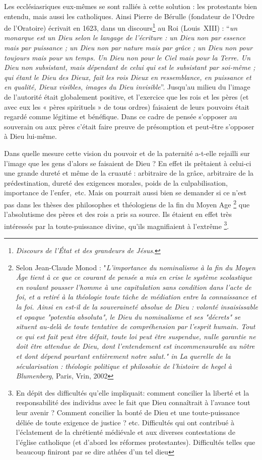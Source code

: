 Les ecclésiasriques eux-mêmes se sont ralliés à cette solution : les protestants bien entendu, mais aussi les catholiques. Ainsi Pierre de Bérulle (fondateur de l'Ordre de l'Oratoire) écrivait en 1623, dans un discours\footnote{\emph{Discours de l'État et des grandeurs de Jésus}.} au Roi (Louis~XIII)  :
    \enquote{\emph{un monarque est un Dieu selon le langage de l'écriture : un Dieu non par essence mais par puissance ; un Dieu non par nature mais par grâce ; un Dieu non pour toujours mais pour un temps. Un Dieu non pour le Ciel mais pour la Terre. Un Dieu non subsistant, mais dépendant de celui qui est le subsistant par soi-même ; qui étant le Dieu des Dieux, fait les rois Dieux en ressemblance, en puissance et en qualité, Dieux visibles, images du Dieu invisible}}. Jusqu'au milieu du  l'image de l'autorité était globalement positive, et l'exercice que les rois et les pères (et avec eux les « pères spirituels » de tous ordres) faisaient de leurs pouvoirs était regardé comme légitime et bénéfique. Dans ce cadre de pensée s'opposer au souverain ou aux pères c'était faire preuve de présomption et peut-être s'opposer à Dieu lui-même. 
    
    Dans quelle mesure cette vision du pouvoir et de la paternité a-t-elle rejailli sur l'image que les gens d'alors se faisaient de Dieu ? En effet ils prêtaient à celui-ci une grande dureté et même de la cruauté : arbitraire de la grâce, arbitraire de la prédestination, dureté des exigences morales, poids de la culpabilisation, importance de l'enfer,~etc. Mais on pourrait aussi bien se demander si ce n'est pas  dans les thèses des philosophes et théologiens de la fin du Moyen Age
    \footnote{Selon Jean-Claude Monod : "\emph{L'importance du nominalisme à la fin du Moyen Âge tient à ce que ce courant de pensée a mis en crise le système scolastique en voulant pousser l'homme à une capitulation sans condition dans l'acte de foi, et a retiré à la théologie toute tâche de médiation entre la connaissance et la foi. Ainsi en est-il de la souveraineté absolue de Dieu : volonté insaisissable et opaque "potentia absoluta", le Dieu du nominalisme et ses "décrets" se situent au-delà de toute tentative de compréhension par l'esprit humain. Tout ce qui est fait peut être défait, toute loi peut être suspendue, nulle garantie ne doit être attendue de Dieu, dont l'entendement est incommensurable au nôtre et dont dépend pourtant entièrement notre salut." in La querelle de la sécularisation : théologie politique et philosohie de l'histoire de hegel à Blumenberg}, Paris, Vrin, 2002}  
    que l'absolutisme des pères et des rois a pris sa source. Ils étaient en effet très intéressés par la toute-puissance divine, qu'ils magnifiaient à l'extrême  \footnote{En dépit des difficultés qu'elle impliquait: comment concilier la liberté et la responsabilité des individus avec le fait que Dieu connaîtrait à l'avance tout leur avenir ? Comment concilier la bonté de Dieu et une toute-puissance déliée de toute exigence de justice ? etc. Difficultés qui ont contribué à l'éclatement de la chrétienté médiévale et aux diverses contestations de l'église catholique (et d'abord les réformes protestantes). Difficultés telles que beaucoup finiront par se dire athées d'un tel dieu}.       
    
